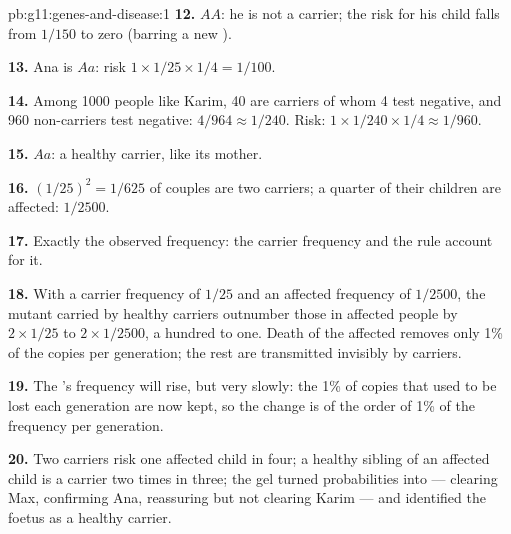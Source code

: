 \begin{solution}{pb:g11:genes-and-disease:1}
\textbf{12.} $AA$: he is not a carrier; the risk for his child falls
from $1/150$ to zero (barring a new ).

\textbf{13.} Ana is $Aa$: risk $1 \times 1/25 \times 1/4 = 1/100$.

\textbf{14.} Among 1000 people like Karim, 40 are carriers of whom 4
test negative, and 960 non-carriers test negative: $4/964 \approx
1/240$. Risk: $1 \times 1/240 \times 1/4 \approx 1/960$.

\textbf{15.} $Aa$: a healthy carrier, like its mother.

\textbf{16.} $(1/25)^2 = 1/625$ of couples are two carriers; a quarter
of their children are affected: $1/2500$.

\textbf{17.} Exactly the observed frequency: the carrier frequency
and the  rule account for it.

\textbf{18.} With a carrier frequency of $1/25$ and an affected
frequency of $1/2500$, the mutant  carried by healthy carriers
outnumber those in affected people by $2 \times 1/25$ to $2 \times
1/2500$, a hundred to one. Death of the affected removes only 1\% of
the copies per generation; the rest are transmitted invisibly by
carriers.

\textbf{19.} The 's frequency will rise, but very slowly: the
1\% of copies that used to be lost each generation are now kept, so
the change is of the order of 1\% of the frequency per generation.

\textbf{20.} Two carriers risk one affected child in four; a healthy
sibling of an affected child is a carrier two times in three; the gel
turned probabilities into  --- clearing Max, confirming Ana,
reassuring but not clearing Karim --- and identified the foetus as a
healthy carrier.
\end{solution}
